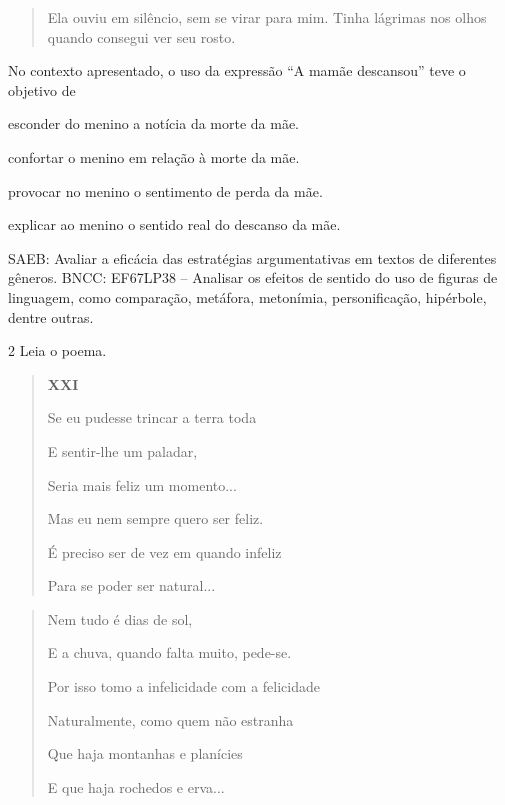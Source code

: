 \begin{quote}
Ela ouviu em silêncio, sem se virar para mim. Tinha lágrimas nos olhos
quando consegui ver seu rosto.
\end{quote}


No contexto apresentado, o uso da expressão ``A mamãe descansou'' teve o
objetivo de

\begin{escolha}
\item esconder do menino a notícia da morte da mãe.

\item confortar o menino em relação à morte da mãe.

\item provocar no menino o sentimento de perda da mãe.

\item explicar ao menino o sentido real do descanso da mãe.
\end{escolha}

SAEB: Avaliar a eficácia das estratégias argumentativas em textos de
diferentes gêneros. BNCC: EF67LP38 -- Analisar os efeitos de sentido do
uso de figuras de linguagem, como comparação, metáfora, metonímia,
personificação, hipérbole, dentre outras.

\num{2} Leia o poema.

\begin{quote}
\textbf{XXI}

Se eu pudesse trincar a terra toda

E sentir-lhe um paladar,

Seria mais feliz um momento...

Mas eu nem sempre quero ser feliz.

É preciso ser de vez em quando infeliz

Para se poder ser natural...
\end{quote}

\begin{quote}
Nem tudo é dias de sol,

E a chuva, quando falta muito, pede-se.

Por isso tomo a infelicidade com a felicidade

Naturalmente, como quem não estranha

Que haja montanhas e planícies

E que haja rochedos e erva...
\end{quote}

